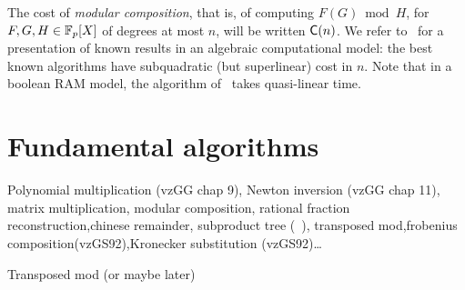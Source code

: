The cost of {\em modular composition}, that is, of computing $F(G)
\bmod H$, for $F,G,H\in\mathbb{F}_p[X]$ of degrees at most $n$, will be
written $\mathsf{C}(n)$. We refer to~\cite[Ch.~12]{vzGG} for a
presentation of known results in an algebraic computational model: the
best known algorithms have subquadratic (but superlinear) cost in
$n$. Note that in a boolean RAM model, the algorithm of~\cite{KeUm08}
takes quasi-linear time.

\section{Fundamental algorithms}
\label{sec:fund-algor}
Polynomial multiplication (vzGG chap 9), Newton inversion (vzGG chap
11), matrix multiplication, modular composition, rational fraction
reconstruction,chinese remainder, subproduct tree
(~\cite[Algorithm~10.3]{vzGG}), transposed mod,frobenius
composition(vzGS92),Kronecker substitution (vzGS92)\ldots

Transposed mod (or maybe later)



